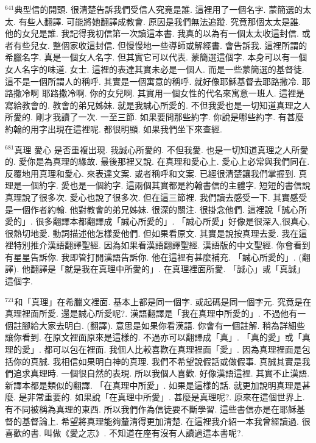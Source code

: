 \documentclass{book}
\begin{document}
$^{641}$典型信的開頭.
很清楚告訴我們受信人究竟是誰.
這裡用了一個名字.
蒙簡選的太太.
有些人翻譯.
可能將她翻譯成教會.
原因是我們無法追蹤.
究竟那個太太是誰.
他的女兒是誰.
我記得我初信第一次讀這本書.
我真的以為有一個太太收這封信.
或者有些兒女.
整個家收這封信.
但慢慢地一些導師或解經書.
會告訴我.
這裡所謂的希臘名字.
真是一個女人名字.
但其實它可以代表.
蒙簡選這個字.
本身可以有一個女人名字的味道.
女士.
這裡的表達其實未必是一個人.
而是一些蒙簡選的基督徒.
這不是一個所謂人的稱呼.
其實是一個寓意的稱呼.
就好像耶穌基督去耶路撒冷.
耶路撒冷啊 耶路撒冷啊.
你的女兒啊.
其實用一個女性的代名來寓意一班人.
這裡是寫給教會的.
教會的弟兄姊妹.
就是我誠心所愛的.
不但我愛也是一切知道真理之人所愛的.
剛才我讀了一次.
一至三節.
如果要問那些約字.
你說是哪些約字.
有甚麼約翰的用字出現在這裡呢.
都很明顯.
如果我們坐下來查經.

$^{681}$真理 愛心 是否重複出現.
我誠心所愛的.
不但我愛.
也是一切知道真理之人所愛的.
愛你是為真理的緣故.
最後那裡又說.
在真理和愛心上.
愛心上必常與我們同在.
反覆地用真理和愛心.
來表達文案.
或者稱呼和文案.
已經很清楚讓我們掌握到.
真理是一個約字.
愛也是一個約字.
這兩個其實都是約翰書信的主體字.
短短的書信說真理說了很多次.
愛心也說了很多次.
但在這三節裡.
我們讀去感受一下.
其實感受是一個作者約翰.
他對教會的弟兄姊妹.
很深的關注.
很掛念他們.
這裡說「誠心所愛的」.
很多翻譯本都翻譯成「誠心所愛的」.
「誠心所愛」好像是很深入,很真心,很熱切地愛.
動詞描述他怎樣愛他們.
但如果看原文.
其實是說按真理去愛.
我在這裡特別推介漢語翻譯聖經.
因為如果看漢語翻譯聖經.
漢語版的中文聖經.
你會看到有星星告訴你.
我即管打開漢語告訴你.
他在這裡有甚麼補充.
「誠心所愛的」.
(翻譯).
他翻譯是「就是我在真理中所愛的」.
在真理裡面所愛.
「誠心」或「真誠」這個字.

$^{721}$和「真理」在希臘文裡面.
基本上都是同一個字.
或起碼是同一個字元.
究竟是在真理裡面所愛.
還是誠心所愛呢?.
漢語翻譯是「我在真理中所愛的」.
不過他有一個註腳給大家去明白.
(翻譯).
意思是如果你看漢語.
你會有一個註解.
稍為詳細些讓你看到.
在原文裡面原來是這樣的.
不過亦可以翻譯成「真」.
「真的愛」或「真理的愛」.
都可以包在裡面.
我個人比較喜歡在真理裡面「愛」.
因為真理裡面是包括你的真誠.
我相信如果明白神的真理.
我們不希望說假話或做假事.
真誠其實是我們追求真理時.
一個很自然的表現.
所以我個人喜歡.
好像漢語這裡.
其實不止漢語.
新譯本都是類似的翻譯.
「在真理中所愛」.
如果是這樣的話.
就更加說明真理是甚麼.
是非常重要的.
如果說「在真理中所愛」.
甚麼是真理呢?.
原來在這個世界上.
有不同被稱為真理的東西.
所以我們作為信徒要不斷學習.
這些書信亦是在耶穌基督的基督論上.
希望將真理能夠釐清得更加清楚.
在這裡我介紹一本我曾經讀過.
很喜歡的書.
叫做《愛之志》.
不知道在座有沒有人讀過這本書呢?.
\end{document}
